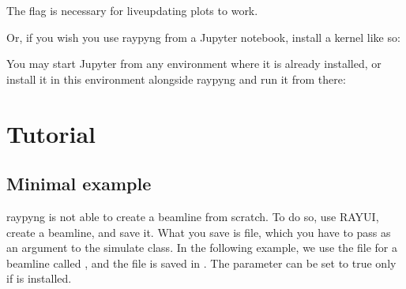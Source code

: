 \documentclass[letterpaper,10pt,english]{sphinxmanual}
\begin{document}
\begin{itemize}
\begin{sphinxVerbatim}[commandchars=\\\{\}]
 
\end{sphinxVerbatim}

\sphinxAtStartPar
The flag  is necessary for live\sphinxhyphen{}updating plots to work.

\sphinxAtStartPar
Or, if you wish you use raypyng from a Jupyter notebook, install a kernel like
so:

\begin{sphinxVerbatim}[commandchars=\\\{\}]
      
\end{sphinxVerbatim}

\sphinxAtStartPar
You may start Jupyter from any environment where it is already installed, or
install it in this environment alongside raypyng and run it from there:

\begin{sphinxVerbatim}[commandchars=\\\{\}]
  
 
\end{sphinxVerbatim}

\end{itemize}

\sphinxstepscope


\chapter{Tutorial}
\label{\detokenize{tutorial:tutorial}}\label{\detokenize{tutorial::doc}}

\section{Minimal example}
\label{\detokenize{tutorial:minimal-example}}
\sphinxAtStartPar
raypyng is not able to create a beamline from scratch. To do so, use RAY\sphinxhyphen{}UI,
create a beamline, and save it. What you save is  file, which you have to
pass as an argument to the  simulate class. In the following example, we
use the file for a beamline called , and the file is saved in .
The  parameter can be set to true only if  is installed.
\end{document}
